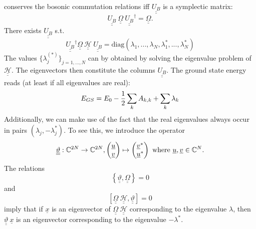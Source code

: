 conserves the bosonic commutation relations iff $\underline{\underline{U_B}}$ is a symplectic matrix:
\begin{equation}\underline{\underline{U_B}}\ {\underline{\underline{\Omega}}}\ \underline{\underline{U_B}}^\dagger={\underline{\underline{\Omega}}}.\end{equation}
There exists $\underline{\underline{U_B}}$ s.t.
\begin{equation}\label{diagonalization_bog_crux}
\underline{\underline{U_B}}^\dagger {\underline{\underline{\Omega}}}\ {\underline{\underline{\mathscr{H}}}}\ \underline{\underline{U_B}}=\mathrm{diag}\left(\lambda_1,...,\lambda_N,\lambda_1^*,...,\lambda_N^*\right)
\end{equation}
The values $\{\lambda_j^{(*)}\}_{j=1,...,N}$ can by obtained by solving the eigenvalue problem of ${\underline{\underline{\mathscr{H}}}}$. The eigenvectors then constitute the columns $\underline{\underline{U_B}}$. The ground state energy reads (at least if all eigenvalues are real):
\begin{equation}\label{GS_energy_formula}
E_{GS}=E_0-\frac12\sum\limits_k A_{k,k}+\sum\limits_k \lambda_k
\end{equation}
Additionally, we can make use of the fact that the real eigenvalues always occur in pairs $(\lambda_j,-\lambda_j^*)$. To see this, we introduce the operator \begin{equation}\underline{\underline{\vartheta}}:\C^{2N}\rightarrow \C^{2N},\begin{pmatrix} \underline u\\ \underline v\end{pmatrix}\mapsto \begin{pmatrix} \underline v^*\\ \underline u^*\end{pmatrix}\ \mathrm{where}\ \underline u,\underline v\in\C^N.\end{equation}
The relations 
\begin{equation}\label{theta_Omega_relation}
\left\{\underline{\underline{\vartheta}},{\underline{\underline{\Omega}}}\right\}=0
\end{equation}
and \begin{equation} \left[ {\underline{\underline{\Omega}}}\ {\underline{\underline{\mathscr{H}}}},\underline{\underline{\vartheta}}\right]=0\end{equation}
imply that if $\underline x$ is an eigenvector of ${\underline{\underline{\Omega}}}\ {\underline{\underline{\mathscr{H}}}}$ corresponding to the eigenvalue $\lambda$, then $\underline{\underline{\vartheta}}\ \underline x$ is an eigenvector corresponding to the eigenvalue $-\lambda^*$.

